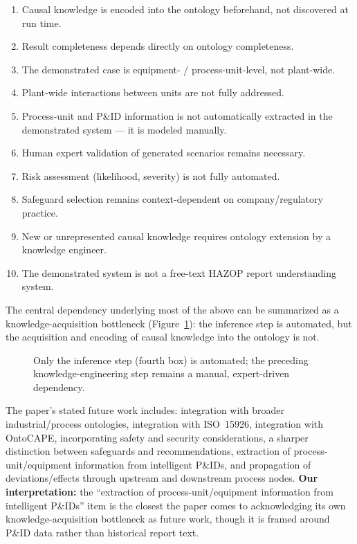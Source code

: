 \begin{enumerate}
  \item Causal knowledge is encoded into the ontology beforehand, not discovered at run time.
  \item Result completeness depends directly on ontology completeness.
  \item The demonstrated case is equipment- / process-unit-level, not plant-wide.
  \item Plant-wide interactions between units are not fully addressed.
  \item Process-unit and P\&ID information is not automatically extracted in the demonstrated system --- it is modeled manually.
  \item Human expert validation of generated scenarios remains necessary.
  \item Risk assessment (likelihood, severity) is not fully automated.
  \item Safeguard selection remains context-dependent on company/regulatory practice.
  \item New or unrepresented causal knowledge requires ontology extension by a knowledge engineer.
  \item The demonstrated system is not a free-text HAZOP report understanding system.
\end{enumerate}

The central dependency underlying most of the above can be summarized as a knowledge-acquisition bottleneck (Figure~\ref{fig:w2-bottleneck}): the inference step is automated, but the acquisition and encoding of causal knowledge into the ontology is not.

\begin{figure}[htbp]
\centering
{}
\caption[Knowledge-acquisition bottleneck]{Only the inference step (fourth box) is automated; the preceding knowledge-engineering step remains a manual, expert-driven dependency.}
\label{fig:w2-bottleneck}
\end{figure}

The paper's stated future work includes: integration with broader industrial/process ontologies, integration with ISO~15926, integration with OntoCAPE, incorporating safety and security considerations, a sharper distinction between safeguards and recommendations, extraction of process-unit/equipment information from intelligent P\&IDs, and propagation of deviations/effects through upstream and downstream process nodes. \textbf{Our interpretation:} the ``extraction of process-unit/equipment information from intelligent P\&IDs'' item is the closest the paper comes to acknowledging its own knowledge-acquisition bottleneck as future work, though it is framed around P\&ID data rather than historical report text.

